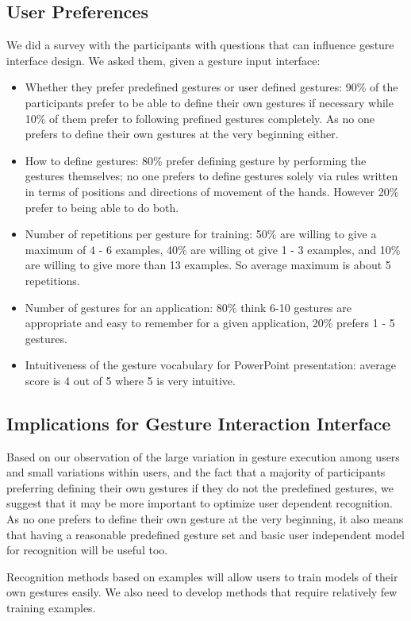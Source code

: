 \subsection{User Preferences}
We did a survey with the participants with questions that can influence
gesture interface design. We asked them, given a gesture input interface:
\begin{itemize}
  \item Whether they prefer predefined gestures or user defined gestures: 90\%
  of the participants prefer to be able to define their own gestures if necessary while 10\% of them prefer to following prefined
gestures completely. As no one prefers to define their own gestures at the very
beginning either.
\item How to define gestures: 80\% prefer defining gesture by 
performing the gestures themselves; no one prefers to
define gestures solely via rules written in terms of positions and directions
of movement of the hands.
However 20\% prefer to being able to do both.
\item Number of repetitions per gesture for training: 50\% are willing to give a
maximum of 4 - 6 examples, 40\% are willing ot give 1 - 3 examples, and 10\% are
willing to give more than 13 examples. So average maximum is about 5
repetitions.
\item Number of gestures for an application: 80\% think 6-10 gestures are
appropriate and easy to remember for a given application, 20\% prefers 1 - 5
gestures.
\item Intuitiveness of the gesture vocabulary for PowerPoint presentation:
average score is 4 out of 5 where 5 is very intuitive.
\end{itemize}

\subsection{Implications for Gesture Interaction Interface}
Based on our observation of the large variation in gesture execution among
users and small variations within users, and the fact that a majority of
participants preferring defining their own gestures if they do not the
predefined gestures, we suggest that it may be more important to optimize user
dependent recognition. As no one prefers to define their own gesture at the very
beginning, it also means that having a reasonable predefined gesture set and
basic user independent model for recognition will be useful too.

Recognition methods based on examples will allow users to train models of their
own gestures easily. We also need to develop methods that
require relatively few training examples.

